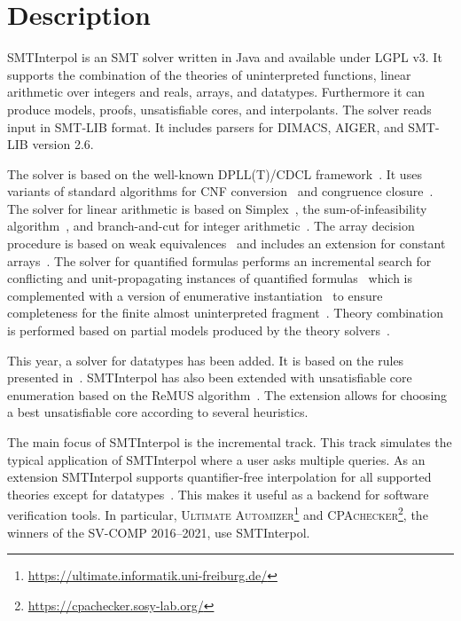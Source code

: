\documentclass[a4paper]{easychair}
\title{\SI and \SIrem\\{\large \TODO{Versions \version}}}
\author{Leonard Fichtner \and Jochen Hoenicke \and Moritz Mohr \and Tanja Schindler}
\institute{
  University of Freiburg\\
  \email{\{hoenicke,schindle\}@informatik.uni-freiburg.de}\\[1ex]
  \today
}
\newcommand\SI{SMTInterpol\xspace}
\begin{document}
\maketitle
\section*{Description}
\SI is an SMT solver written in Java and available under LGPL v3.
It supports the combination of the theories of uninterpreted functions, linear arithmetic over integers and reals, arrays, and datatypes.
Furthermore it can produce models, proofs, unsatisfiable cores, and interpolants.
The solver reads input in SMT-LIB format.
It includes parsers for DIMACS, AIGER, and SMT-LIB version 2.6.

The solver is based on the well-known DPLL(T)/CDCL framework~\cite{DBLP:conf/cav/GanzingerHNOT04}.
It uses variants of standard algorithms for CNF conversion~\cite{DBLP:journals/jsc/PlaistedG86} and congruence closure~\cite{DBLP:conf/rta/NieuwenhuisO05}.
The solver for linear arithmetic is based on Simplex~\cite{DBLP:conf/cav/DutertreM06}, the sum-of-infeasibility algorithm~\cite{DBLP:conf/fmcad/KingBD13}, and branch-and-cut for integer arithmetic~\cite{DBLP:conf/cav/ChristH15,DBLP:conf/cav/DilligDA09}.
The array decision procedure is based on weak equivalences~\cite{DBLP:conf/frocos/ChristH15} and includes an extension for constant arrays~\cite{DBLP:conf/vmcai/HoenickeS19}.
The solver for quantified formulas performs an incremental search for conflicting and unit-propagating instances of quantified formulas~\cite{DBLP:conf/vmcai/HoenickeS21} which is complemented with a version of enumerative instantiation~\cite{DBLP:conf/tacas/ReynoldsBF18} to ensure completeness for the finite almost uninterpreted fragment~\cite{DBLP:conf/cav/GeM09}.
Theory combination is performed based on partial models produced by the theory solvers~\cite{DBLP:journals/entcs/MouraB08}.

This year, a solver for datatypes has been added.
It is based on the rules presented in~\cite{DBLP:journals/jsat/BarrettST07}.
SMTInterpol has also been extended with unsatisfiable core enumeration based on the ReMUS algorithm~\cite{DBLP:conf/atva/BendikCB18}.
The extension allows for choosing a best unsatisfiable core according to several heuristics.

The main focus of \SI is the incremental track.
This track simulates the typical application of \SI where a user asks multiple queries.
As an extension \SI supports quantifier-free interpolation for all supported theories except for datatypes~\cite{DBLP:journals/jar/ChristH16,DBLP:conf/cade/HoenickeS18,DBLP:conf/vmcai/HoenickeS19}.
This makes it useful as a backend for software verification tools. 
In particular, \textsc{Ultimate Automizer}\footnote{\url{https://ultimate.informatik.uni-freiburg.de/}} and \textsc{CPAchecker}\footnote{\url{https://cpachecker.sosy-lab.org/}}, the winners of the SV-COMP 2016--2021, use \SI.
\end{document}
